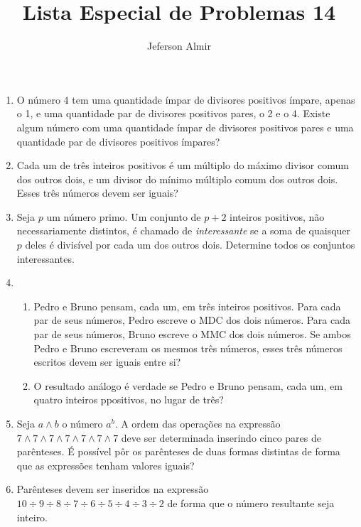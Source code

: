 \documentclass{article}
\title{Lista Especial de Problemas 14}
\author{Jeferson Almir}
\date{}
\begin{document}
\maketitle

\begin{enumerate}
    \item O número 4 tem uma quantidade ímpar de divisores positivos ímpare, apenas o 1, e uma quantidade par de divisores positivos pares, o 2 e o 4. Existe algum número com uma quantidade ímpar de divisores positivos pares e uma quantidade par de divisores positivos ímpares?
    
    \item Cada um de três inteiros positivos é um múltiplo do máximo divisor comum dos outros dois, e um divisor do mínimo múltiplo comum dos outros dois. Esses três números devem ser iguais?
    
    \item Seja $p$ um número primo. Um conjunto de $p+2$ inteiros positivos, não necessariamente distintos, é chamado de \textit{interessante} se a soma de quaisquer $p$ deles é divisível por cada um dos outros dois. Determine todos os conjuntos interessantes.
    
    \item \begin{enumerate}
    \item Pedro e Bruno pensam, cada um, em três inteiros positivos. Para cada par de seus números, Pedro escreve o MDC dos dois números. Para cada par de seus números, Bruno escreve o MMC dos dois números. Se ambos Pedro e Bruno escreveram os mesmos três números, esses três números escritos devem ser iguais entre si?
    
    \item O resultado análogo é verdade se Pedro e Bruno pensam, cada um, em quatro inteiros ppositivos, no lugar de três?
    \end{enumerate}
    
    \item Seja $a\land b$ o número $a^b$. A ordem das operações na expressão $7\land 7\land 7\land 7\land 7\land 7\land 7$ deve ser determinada inserindo cinco pares de parênteses. É possível pôr os parênteses de duas formas distintas de forma que as expressões tenham valores iguais?
    
    \item Parênteses devem ser inseridos na expressão $10\div9\div8\div7\div6\div5\div4\div3\div2$ de forma que o número resultante seja inteiro.
    

\end{enumerate}
\end{document}
